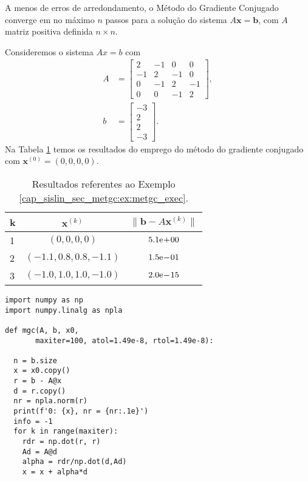 \begin{obs}
  A menos de erros de arredondamento, o Método do Gradiente Conjugado converge em no máximo $n$ passos para a solução do sistema $A\pmb{x} = \pmb{b}$, com $A$ matriz positiva definida $n\times n$.
\end{obs}


\begin{ex}\label{cap_sislin_sec_metgc:ex:metgc_exec}
  Consideremos o sistema $Ax = b$ com
  \begin{align}
    A &=
    \begin{bmatrix}
      2 & -1 & 0 & 0\\
      -1 & 2 & -1 & 0\\
      0 & -1 & 2 & -1 \\
      0 & 0 & -1 & 2
    \end{bmatrix},\\
    b &=
    \begin{bmatrix}
      -3\\
      2\\
      2\\
      -3
    \end{bmatrix}.
  \end{align}
  Na Tabela \ref{cap_sislin_sec_metgc:tab:metgc_exec} temos os resultados do emprego do método do gradiente conjugado com $\pmb{x}^{(0)} = (0, 0, 0, 0)$.

  \begin{table}[H]
    \centering
    \caption{Resultados referentes ao Exemplo \ref{cap_sislin_sec_metgc:ex:metgc_exec}.}
    \label{cap_sislin_sec_metgc:tab:metgc_exec}
    \begin{tabular}{l|c|c}
      k & $\pmb{x}^{(k)}$ & $\|\pmb{b}-A\pmb{x}^{(k)}\|$\\\hline
      1 & $(0, 0, 0, 0)$ & $5.1\mathrm{e}\!+\!00$\\
      2 & $(-1.1, 0.8, 0.8, -1.1)$ & $1.5\mathrm{e}\!-\!01$\\
      3 & $(-1.0, 1.0, 1.0, -1.0)$ & $2.0\mathrm{e}\!-\!15$\\\hline
    \end{tabular}
  \end{table}

\begin{lstlisting}[caption=mgc.py, label=cap_sislin_sec_metgc:cod:mgc.py]
import numpy as np
import numpy.linalg as npla

def mgc(A, b, x0,
       maxiter=100, atol=1.49e-8, rtol=1.49e-8):
    
  n = b.size
  x = x0.copy()
  r = b - A@x
  d = r.copy()
  nr = npla.norm(r)
  print(f'0: {x}, nr = {nr:.1e}')
  info = -1
  for k in range(maxiter):
    rdr = np.dot(r, r)
    Ad = A@d
    alpha = rdr/np.dot(d,Ad)
    x = x + alpha*d


\end{lstlisting}
\end{ex}
